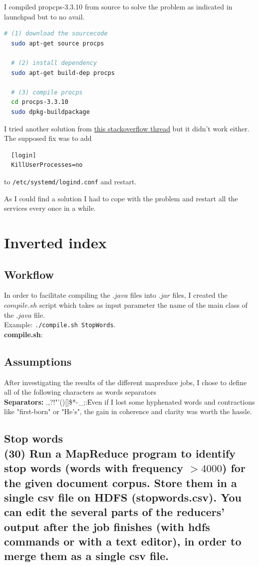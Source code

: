 \documentclass[a4paper,10pt]{article}
\begin{document}
I compiled propcps-3.3.10 from source to solve the problem as indicated in launchpad but to no avail.
\begin{lstlisting}[language=bash]
  # (1) download the sourcecode
  sudo apt-get source procps

  # (2) install dependency
  sudo apt-get build-dep procps

  # (3) compile procps
  cd procps-3.3.10
  sudo dpkg-buildpackage
\end{lstlisting}


I tried another solution from \href{http://stackoverflow.com/questions/38419078/logouts-while-running-hadoop-under-ubuntu-16-04}{this stackoverflow thread} but it didn't work either.
The supposed fix was to add
\begin{lstlisting}
  [login]
  KillUserProcesses=no
\end{lstlisting}
to \lstinline{/etc/systemd/logind.conf} and restart.

As I could find a solution I had to cope with the problem and restart all the
services every once in a while.

\section{Inverted index}
\subsection*{Workflow}
In order to facilitate compiling the $.java$ files into $.jar$ files, I created
the $compile.sh$ script which takes as input parameter the name of the main class of the $.java$ file.
\\Example: \lstinline{./compile.sh StopWords}.
\\ \textbf{compile.sh}:


\subsection*{Assumptions}
After investigating the results of the different mapreduce jobs, I chose to define
all of the following characters as words separators
\\ \textbf{Separators:} .,?!"'()[]\$*-\_;:\|

Even if I lost some hyphenated words and contractions like "first-born" or "He's", the gain in
coherence and clarity was worth the hassle.

\subsection{Stop words\\
(30) Run a MapReduce program to identify stop words (words with frequency $> 4000$)
for the given document corpus. Store them in a single csv file on HDFS
(stopwords.csv). You can edit the several parts of the reducers’ output after the job
finishes (with hdfs commands or with a text editor), in order to merge them as a single
csv file.}
\end{document}

